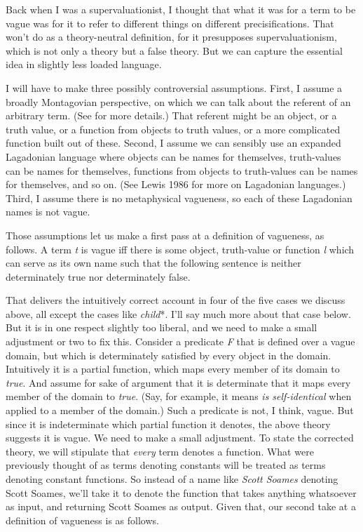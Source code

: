 Back when I was a supervaluationist, I thought that what it was for a term to be vague was for it to refer to different things on different precisifications. That won't do as a theory-neutral definition, for it presupposes supervaluationism, which is not only a theory but a false theory. But we can capture the essential idea in slightly less loaded language.

I will have to make three possibly controversial assumptions. First, I assume a broadly Montagovian perspective, on which we can talk about the referent of an arbitrary term. (See \citet{Montague1970, Montague1973} for more details.) That referent might be an object, or a truth value, or a function from objects to truth values, or a more complicated function built out of these. Second, I assume we can sensibly use an expanded  Lagadonian language where objects can be names for themselves, truth-values can be names for themselves, functions from objects to truth-values can be names for themselves, and so on. (See Lewis 1986 for more on Lagadonian languages.) Third, I assume there is no metaphysical vagueness, so each of these Lagadonian names is not vague.

Those assumptions let us make a first pass at a definition of vagueness, as follows. A term \textit{t} is vague iff there is some object, truth-value or function \textit{l} which can serve as its own name such that the following sentence is neither determinately true nor determinately false.


\noindent That delivers the intuitively correct account in four of the five cases we discuss above, all except the cases like \textit{child}*. I'll say much more about that case below. But it is in one respect slightly too liberal, and we need to make a small adjustment or two to fix this. Consider a predicate \textit{F} that is defined over a vague domain, but which is determinately satisfied by every object in the domain. Intuitively it is a partial function, which maps every member of its domain to \textit{true}. And assume for sake of argument that it is determinate that it maps every member of the domain to \textit{true}. (Say, for example, it means \textit{is self-identical} when applied to a member of the domain.) Such a predicate is not, I think, vague. But since it is indeterminate which partial function it denotes, the above theory suggests it is vague. We need to make a small adjustment. To state the corrected theory, we will stipulate that \textit{every} term denotes a function. What were previously thought of as terms denoting constants will be treated as terms denoting constant functions. So instead of a name like \textit{Scott Soames} denoting Scott Soames, we'll take it to denote the function that takes anything whatsoever as input, and returning Scott Soames as output. Given that, our second take at a definition of vagueness is as follows.

